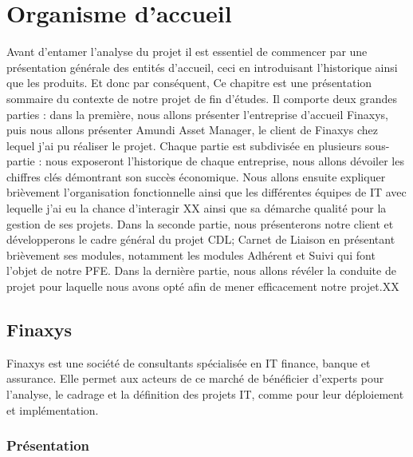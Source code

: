 
\chapter{Organisme d’accueil} %

\label{Chapter01} %

\par
Avant d'entamer l’analyse du projet il est essentiel de commencer par une présentation générale des entités d’accueil, ceci en introduisant l'historique ainsi que les produits. Et donc par conséquent, Ce chapitre est une présentation sommaire du contexte de notre projet de fin d’études. Il comporte deux grandes parties : dans la première, nous allons présenter l’entreprise d’accueil Finaxys, puis nous allons présenter Amundi Asset Manager, le client de Finaxys chez lequel j'ai pu réaliser le projet.
Chaque partie est subdivisée en plusieurs sous-partie : nous exposeront l'historique de chaque entreprise, nous allons dévoiler les chiffres clés démontrant son succès économique. Nous allons ensuite expliquer brièvement l'organisation fonctionnelle ainsi que les différentes équipes de IT avec lequelle j'ai eu la chance d'interagir XX ainsi que sa démarche qualité pour la gestion de ses projets. Dans la seconde partie, nous présenterons notre client et développerons le cadre général du projet CDL; Carnet de Liaison en présentant brièvement ses modules, notamment les modules Adhérent et Suivi qui font l’objet de notre PFE. Dans la dernière partie, nous allons révéler la conduite de projet pour laquelle nous avons opté afin de mener efficacement notre projet.XX


\section{Finaxys}
\par
Finaxys est une société de consultants spécialisée en IT finance, banque et assurance. Elle permet aux acteurs de ce marché de bénéficier d’experts pour l’analyse, le cadrage et la définition des projets IT, comme pour leur déploiement et implémentation.

\subsection{Présentation}

